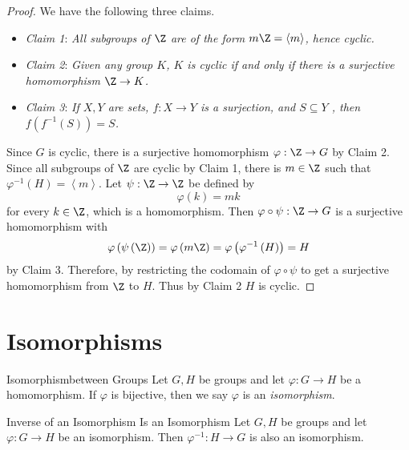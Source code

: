 \documentclass[pmath347]{subfiles}
\begin{document}
    \begin{proof}
        We have the following three claims.
        \begin{itemize}
            \item \textit{Claim 1}: \textit{All subgroups of $\Z$ are of the form $m\Z = \left< m \right>$, hence cyclic.}
            \item \textit{Claim 2}: \textit{Given any group $K$, $K$ is cyclic if and only if there is a surjective homomorphism $\Z\to K$.}
            \item \textit{Claim 3}: \textit{If $X,Y$ are sets, $f:X\to Y$ is a surjection, and $S\subseteq Y$ , then $f\left( f^{-1} \left( S \right)  \right)= S$.}
        \end{itemize}
        Since $G$ is cyclic, there is a surjective homomorphism $\varphi:\Z\to G$ by Claim 2. Since all subgroups of $\Z$ are cyclic by Claim 1, there is $m\in\Z$ such that $\varphi^{-1} \left( H \right) = \left< m \right>$. Let $\psi:\Z\to\Z$ be defined by
        \begin{equation*}
            \varphi\left( k \right) = mk
        \end{equation*}
        for every $k\in\Z$, which is a homomorphism. Then $\varphi\circ\psi:\Z\to G$ is a surjective homomorphism with
        \begin{equation*}
            \varphi\left( \psi\left( \Z \right)  \right) = \varphi\left( m\Z \right) = \varphi\left( \varphi^{-1} \left( H \right)  \right)= H
        \end{equation*}
        by Claim 3. Therefore, by restricting the codomain of $\varphi\circ\psi$ to get a surjective homomorphism from $\Z$ to $H$. Thus by Claim 2 $H$ is cyclic.
    \end{proof}

    \section{Isomorphisms}

    \begin{definition}{Isomorphism}{between Groups}
        Let $G,H$ be groups and let $\varphi:G\to H$ be a homomorphism. If $\varphi$ is bijective, then we say $\varphi$ is an \emph{isomorphism}.
    \end{definition}

    \begin{prop}{Inverse of an Isomorphism Is an Isomorphism}
        Let $G,H$ be groups and let $\varphi:G\to H$ be an isomorphism. Then $\varphi^{-1} :H\to G$ is also an isomorphism.
    \end{prop}
\end{document}
